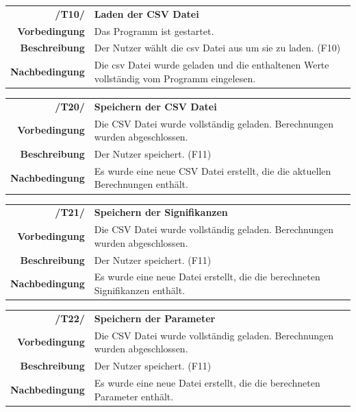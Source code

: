 \documentclass{article}
\begin{document}
\begin{table}[H]
\begin{tabularx}{\textwidth}{rX}
\textbf{/T10/}         & \textbf{Laden der CSV Datei}                                                               \\
\textbf{Vorbedingung}  & Das Programm ist gestartet.                                                                \\
\textbf{Beschreibung}  & Der Nutzer wählt die csv Datei aus um sie zu laden. (F10)                                \\
\textbf{Nachbedingung} & Die csv Datei wurde geladen und die enthaltenen Werte vollständig vom Programm eingelesen.
\end{tabularx}
\end{table}

\begin{table}[H]
\begin{tabularx}{\textwidth}{rX}
\textbf{/T20/}         & \textbf{Speichern der CSV Datei} \\
\textbf{Vorbedingung}  & Die CSV Datei wurde vollständig geladen. Berechnungen wurden abgeschlossen.   \\
\textbf{Beschreibung}  & Der Nutzer speichert. (F11)                                \\
\textbf{Nachbedingung} & Es wurde eine neue CSV Datei erstellt, die die aktuellen Berechnungen enthält.
\end{tabularx}
\end{table}

\begin{table}[H]
\begin{tabularx}{\textwidth}{rX}
\textbf{/T21/}         & \textbf{Speichern der Signifikanzen}  \\
\textbf{Vorbedingung}  & Die CSV Datei wurde vollständig geladen. Berechnungen wurden abgeschlossen.   \\
\textbf{Beschreibung}  & Der Nutzer speichert. (F11)                               \\
\textbf{Nachbedingung} & Es wurde eine neue Datei erstellt, die die berechneten Signifikanzen enthält.
\end{tabularx}
\end{table}

\begin{table}[H]
\begin{tabularx}{\textwidth}{rX}
\textbf{/T22/}         & \textbf{Speichern der Parameter} \\
\textbf{Vorbedingung}  & Die CSV Datei wurde vollständig geladen. Berechnungen wurden abgeschlossen.   \\
\textbf{Beschreibung}  & Der Nutzer speichert. (F11) \\
\textbf{Nachbedingung} & Es wurde eine neue Datei erstellt, die die berechneten Parameter enthält.
\end{tabularx}
\end{table}
\end{document}
